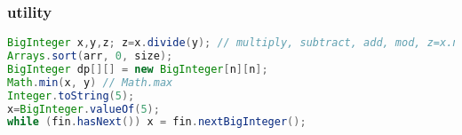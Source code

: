 	\subsubsection{utility}
	\begin{lstlisting}[language=java]
BigInteger x,y,z; z=x.divide(y); // multiply, subtract, add, mod, z=x.negate()
Arrays.sort(arr, 0, size);
BigInteger dp[][] = new BigInteger[n][n];
Math.min(x, y) // Math.max
Integer.toString(5);
x=BigInteger.valueOf(5);
while (fin.hasNext()) x = fin.nextBigInteger();
	\end{lstlisting}